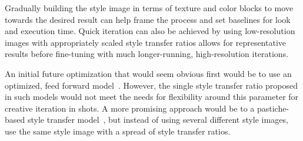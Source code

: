 \documentclass{acmsiggraph}
\begin{document}
Gradually building the style image in terms of texture and color blocks to move towards the desired result can help frame the process and set baselines for look and execution time. Quick iteration can also be achieved by using low-resolution images with appropriately scaled style transfer ratios allows for representative results before fine-tuning with much longer-running, high-resolution iterations.

An initial future optimization that would seem obvious first would be to use an optimized, feed forward model~\cite{ulyanov:2016}. However, the single style transfer ratio proposed in such models would not meet the needs for flexibility around this parameter for creative iteration in shots. A more promising approach would be to a pastiche-based style transfer model~\cite{dumoulin:2016}, but instead of using several different style images, use the same style image with a spread of style transfer ratios.


\nocite{*}

\end{document}
